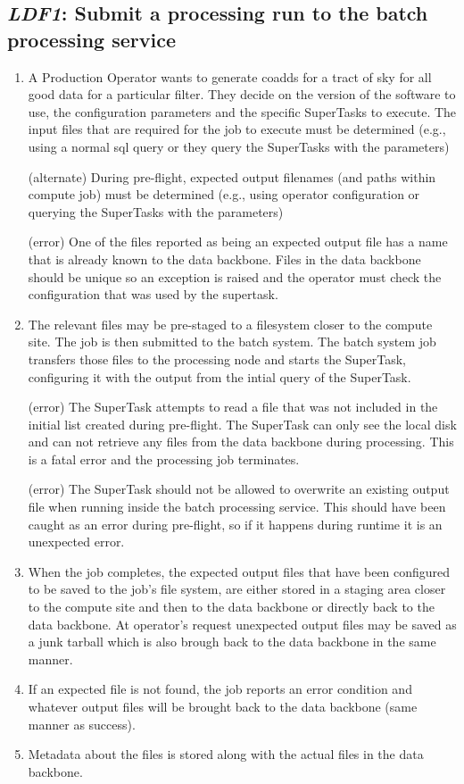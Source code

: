 \documentclass[DM,toc,lsstdraft]{lsstdoc}
\newcommand{\usecase}[3]{%
\subsection{\emph{#1}: #2}
\label{use:#1}
\begin{enumerate}[label=\alph*.]
#3
\end{enumerate}
}
\begin{document}
\usecase{LDF1}{Submit a processing run to the batch processing service}{%

\item
A Production Operator wants to generate coadds for a tract of sky for all good data for a particular filter.
They decide on the version of the software to use, the configuration parameters and the specific SuperTasks to execute.
The input files that are required for the job to execute must be determined (e.g., using a normal sql query or they query the SuperTasks with the parameters)

(alternate)
During pre-flight, expected output filenames (and paths within compute job) must be determined (e.g., using operator configuration or querying the SuperTasks with the parameters)

(error)
One of the files reported as being an expected output file has a name that is already known to the data backbone.
Files in the data backbone should be unique so an exception is raised and the operator must check the configuration that was used by the supertask.

\item
The relevant files may be pre-staged to a filesystem closer to the compute site.
The job is then submitted to the batch system.
The batch system job transfers those files to the processing node and starts the SuperTask, configuring it with the output from the intial query of the SuperTask.

(error)
The SuperTask attempts to read a file that was not included in the initial list created during pre-flight.
The SuperTask can only see the local disk and can not retrieve any files from the data backbone during processing.
This is a fatal error and the processing job terminates.

(error)
The SuperTask should not be allowed to overwrite an existing output file when running inside the batch processing service.
This should have been caught as an error during pre-flight, so if it happens during runtime it is an unexpected error.

\item
When the job completes, the expected output files that have been configured to be saved to the job's file system, are either stored in a staging area closer to the compute site and then to the data backbone or directly back to the data backbone.
At operator's request unexpected output files may be saved as a junk tarball which is also brough back to the data backbone in the same manner.

\item
If an expected file is not found, the job reports an error condition and whatever output files will be brought back to the data backbone (same manner as success).

\item
Metadata about the files is stored along with the actual files in the data backbone.

}
\end{document}
